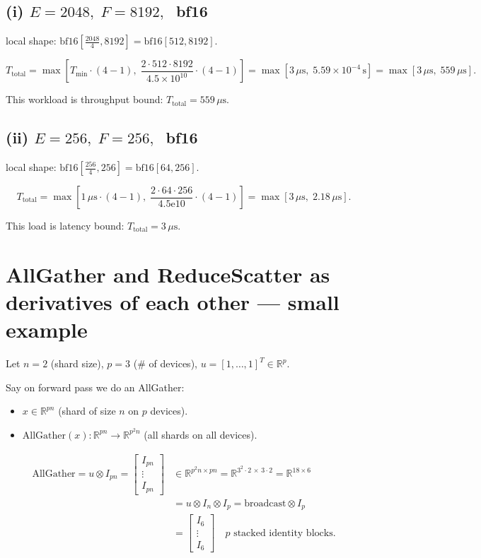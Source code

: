 \documentclass[11pt]{article}
\newcommand{\Ttotal}{T_{\text{total}}}
\newcommand{\Tmin}{T_{\min}}
\begin{document}
\subsection*{(i) $E = 2048,\; F = 8192,\;$ bf16}

local shape: $\text{bf16}\!\left[\tfrac{2048}{4}, 8192\right] = \text{bf16}[512, 8192]$.

\[
\Ttotal = \max\!\left[\Tmin \cdot (4-1),\; \frac{2 \cdot 512 \cdot 8192}{4.5 \times 10^{10}} \cdot (4-1)\right]
= \max[3\,\mu\text{s},\; 5.59 \times 10^{-4}\,\text{s}] = \max[3\,\mu\text{s},\; 559\,\mu\text{s}].
\]

This workload is throughput bound: $\Ttotal = 559\,\mu\text{s}$.

\subsection*{(ii) $E = 256,\; F = 256,\;$ bf16}

local shape: $\text{bf16}\!\left[\tfrac{256}{4}, 256\right] = \text{bf16}[64, 256]$.

\[
\Ttotal = \max\!\left[1\,\mu\text{s} \cdot (4-1),\; \frac{2 \cdot 64 \cdot 256}{4.5\mathrm{e}10} \cdot (4-1)\right]
= \max[3\,\mu\text{s},\; 2.18\,\mu\text{s}].
\]

This load is latency bound: $\Ttotal = 3\,\mu\text{s}$.

\section*{AllGather and ReduceScatter as derivatives of each other --- small example}

Let $n = 2$ (shard size), $p = 3$ (\# of devices), $u = [1, \ldots, 1]^T \in \mathbb{R}^p$.

Say on forward pass we do an AllGather:
\begin{itemize}[leftmargin=*]
  \item $x \in \mathbb{R}^{pn}$ (shard of size $n$ on $p$ devices).
  \item $\text{AllGather}(x) : \mathbb{R}^{pn} \to \mathbb{R}^{p^2 n}$ (all shards on all devices).
\end{itemize}

\begin{align*}
\text{AllGather} = u \otimes I_{pn} = \begin{bmatrix} I_{pn} \\ \vdots \\ I_{pn} \end{bmatrix}
&\in \mathbb{R}^{p^2 n \times pn} = \mathbb{R}^{3^2 \cdot 2 \,\times\, 3 \cdot 2} = \mathbb{R}^{18 \times 6} \\
&= u \otimes I_n \otimes I_p = \text{broadcast} \otimes I_p \\
&= \begin{bmatrix} I_6 \\ \vdots \\ I_6 \end{bmatrix} \quad p \text{ stacked identity blocks}.
\end{align*}
\end{document}
